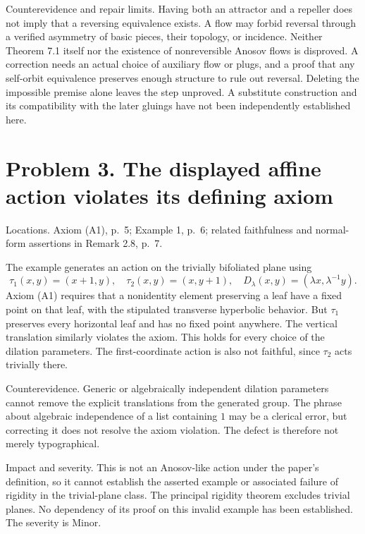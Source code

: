 \documentclass[10pt]{article}
\begin{document}
Counterevidence and repair limits. Having both an attractor and a repeller does not imply that a reversing equivalence exists. A flow may forbid reversal through a verified asymmetry of basic pieces, their topology, or incidence. Neither Theorem 7.1 itself nor the existence of nonreversible Anosov flows is disproved. A correction needs an actual choice of auxiliary flow or plugs, and a proof that any self-orbit equivalence preserves enough structure to rule out reversal. Deleting the impossible premise alone leaves the step unproved. A substitute construction and its compatibility with the later gluings have not been independently established here.\par
\section*{Problem 3. The displayed affine action violates its defining axiom}
Locations. Axiom (A1), p. 5; Example 1, p. 6; related faithfulness and normal-form assertions in Remark 2.8, p. 7.\par
The example generates an action on the trivially bifoliated plane using \[\tau_1(x,y)=(x+1,y),\quad \tau_2(x,y)=(x,y+1),\quad
 D_\lambda(x,y)=(\lambda x,\lambda^{-1}y).\] Axiom (A1) requires that a nonidentity element preserving a leaf have a fixed point on that leaf, with the stipulated transverse hyperbolic behavior. But \(\tau_1\) preserves every horizontal leaf and has no fixed point anywhere. The vertical translation similarly violates the axiom. This holds for every choice of the dilation parameters. The first-coordinate action is also not faithful, since \(\tau_2\) acts trivially there.\par
Counterevidence. Generic or algebraically independent dilation parameters cannot remove the explicit translations from the generated group. The phrase about algebraic independence of a list containing \(1\) may be a clerical error, but correcting it does not resolve the axiom violation. The defect is therefore not merely typographical.\par
Impact and severity. This is not an Anosov-like action under the paper’s definition, so it cannot establish the asserted example or associated failure of rigidity in the trivial-plane class. The principal rigidity theorem excludes trivial planes. No dependency of its proof on this invalid example has been established. The severity is Minor.\par
\end{document}
